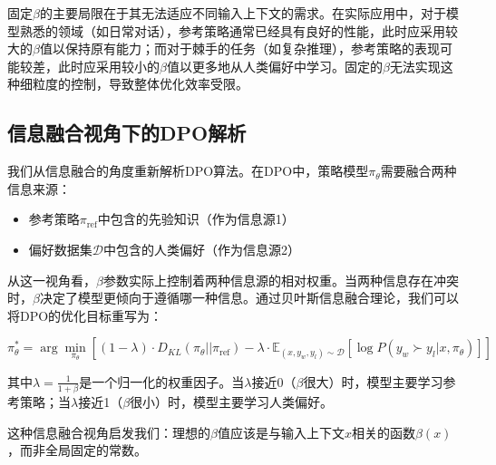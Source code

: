 固定$\beta$的主要局限在于其无法适应不同输入上下文的需求。在实际应用中，对于模型熟悉的领域（如日常对话），参考策略通常已经具有良好的性能，此时应采用较大的$\beta$值以保持原有能力；而对于棘手的任务（如复杂推理），参考策略的表现可能较差，此时应采用较小的$\beta$值以更多地从人类偏好中学习。固定的$\beta$无法实现这种细粒度的控制，导致整体优化效率受限。

\subsection{信息融合视角下的DPO解析}
我们从信息融合的角度重新解析DPO算法。在DPO中，策略模型$\pi_\theta$需要融合两种信息来源：

\begin{itemize}
    \item 参考策略$\pi_{\text{ref}}$中包含的先验知识（作为信息源1）
    \item 偏好数据集$\mathcal{D}$中包含的人类偏好（作为信息源2）
\end{itemize}

从这一视角看，$\beta$参数实际上控制着两种信息源的相对权重。当两种信息存在冲突时，$\beta$决定了模型更倾向于遵循哪一种信息。通过贝叶斯信息融合理论，我们可以将DPO的优化目标重写为：

\begin{equation}
\pi_\theta^* = \arg\min_{\pi_\theta} \left[ (1-\lambda) \cdot D_{KL}(\pi_\theta || \pi_{\text{ref}}) - \lambda \cdot \mathbb{E}_{(x, y_w, y_l) \sim \mathcal{D}} [\log P(y_w \succ y_l | x, \pi_\theta)] \right]
\end{equation}

其中$\lambda = \frac{1}{1+\beta}$是一个归一化的权重因子。当$\lambda$接近0（$\beta$很大）时，模型主要学习参考策略；当$\lambda$接近1（$\beta$很小）时，模型主要学习人类偏好。

这种信息融合视角启发我们：理想的$\beta$值应该是与输入上下文$x$相关的函数$\beta(x)$，而非全局固定的常数。 